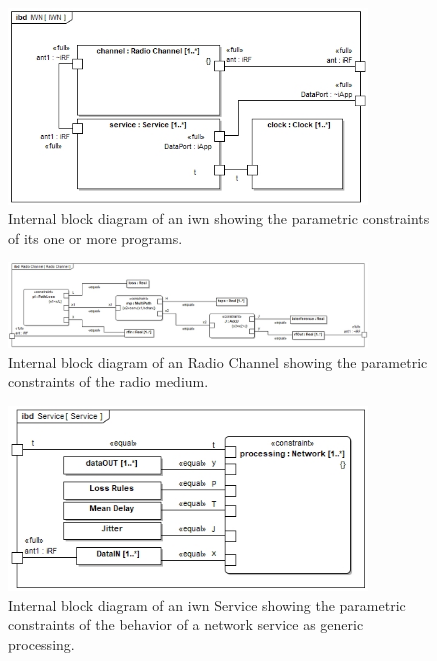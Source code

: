 \begin{figure}[!th]
	\centering
	\includegraphics[width=0.85\textwidth]{chapter-conclusions/images/IWN}
	\caption{Internal block diagram of an \gls{iwn} showing the parametric constraints of its one or more programs.}
	\label{fig:concl:iwn-ibd}
\end{figure}

\begin{figure}[!th]
	\centering
	\includegraphics[width=0.85\textwidth]{chapter-conclusions/images/RadioChannel}
	\caption{Internal block diagram of an Radio Channel showing the parametric constraints of the radio medium.}
	\label{fig:concl:RadioChannel-ibd}
\end{figure}

\begin{figure}[!th]
	\centering
	\includegraphics[width=0.85\textwidth]{chapter-conclusions/images/Service}
	\caption{Internal block diagram of an \gls{iwn} Service showing the parametric constraints of the behavior of a network service as generic processing.}
	\label{fig:concl:Service-ibd}
\end{figure}

